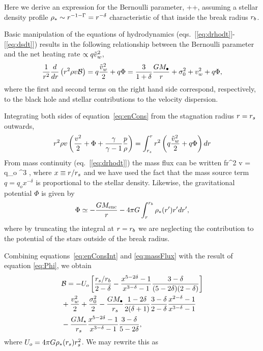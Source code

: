 Here we derive an expression for the Bernoulli parameter, 
\be
{} \equiv \ke
+\gammaf {}+\Phi,
\ee
assuming a stellar density profile $\rho_*\sim r^{-1-\Gamma}=r^{-\delta}$ characteristic of that inside the break radius $r_b$.

Basic manipulation of the equations of hydrodynamics (eqs.~[\ref{eq:drhodt}]-[\ref{eq:dsdt}]) results in the following relationship between the Bernoulli parameter and the net heating rate $\propto q \tilde{v}_{w}^{2}$,
\begin{align}
\frac{1}{r^2} \frac{d}{dr} \left(r^2 \rho v \mathcal{B} \right) = q \frac{\tilde{v}_{w}^2}{2} + q \Phi = \frac{3}{1+\delta}\frac{G
  M_{\bullet}}{r}+\sigma_0^2+v_w^2 + q \Phi,
\label{eq:enCons}
\end{align}
where the first and second terms on the right hand side correspond, respectively, to the black hole and stellar contributions to the velocity dispersion.

Integrating both sides of equation~\eqref{eq:enCons} from the stagnation radius $r = r_s$ outwards,
\begin{align}
  r^2 \rho v \left(\frac{v^2}{2}+\Phi+\frac{\gamma}{\gamma-1} \frac{p}{\rho} \right)= \int_{r_s}^{r}
    r^2 \left(q \frac{\tilde{v}_{w}^2}{2} + q\Phi\right) dr
    \label{eq:enConsInt}
\end{align}
From mass continuity (eq.~[\ref{eq:drhodt}]) the mass flux can be written
\be
 f\equiv r^2 \rho v = q_o \rs^3 ,
 \label{eq:massFlux}
\ee
where $x \equiv r/r_s$ and we have used the fact that the mass source term $q = q_o x^{-\delta}$ is proportional to the stellar density.  Likewise, the gravitational potential $\Phi$ is given by
\begin{align}
\Phi \simeq -\frac{G M_{\rm enc}}{r} -4 \pi G \int_{r}^{r_b} \rho_*(r') r' dr',
\label{eq:Phi}
\end{align}
where by truncating the integral at $r = r_b$ we are neglecting the contribution to the potential of the stars outside of the break radius.

Combining equations~\eqref{eq:enConsInt} and \eqref{eq:massFlux} with the result of equation \eqref{eq:Phi}, we obtain 
\begin{align}
  &\mathcal{B} = -U_o\left[\frac{r_s/r_b}{2-\delta}-\frac{x^{5-2\delta}-1}{x^{3-\delta}-1}\frac{3-\delta}{(5-2\delta)(2-\delta)}\right]\nonumber\\
  &+\frac{v_w^2}{2}+\frac{\sigma_0^2}{2}- \frac{G M_{\bullet}}{r_s}
  \frac{1-2\delta}{2(\delta+1)} \frac{3-\delta}{2-\delta}\frac{x^{2-\delta}-1}{x^{3-\delta}-1}
  \nonumber\\
  &-\frac{G M_\star}{r_s}
  \frac{x^{5-2\delta}-1}{x^{3-\delta}-1}\frac{3-\delta}{5-2\delta},
\end{align}
where $U_o=4 \pi G \rho_*(r_s) r_s^2$.  We may rewrite this as 

